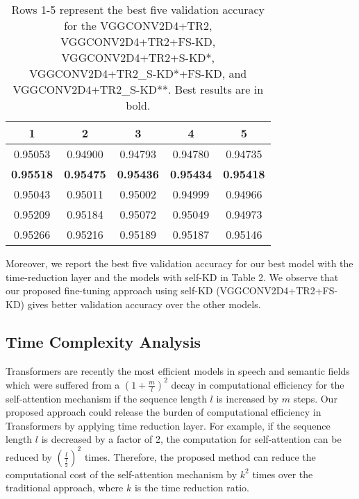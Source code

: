 \documentclass{article}
\begin{document}
\begin{table}[ht]
\caption{Rows 1-5 represent the best five validation accuracy for the VGGCONV2D4+TR2, VGGCONV2D4+TR2+FS-KD, VGGCONV2D4+TR2+S-KD*, VGGCONV2D4+TR2_S-KD*+FS-KD, and VGGCONV2D4+TR2_S-KD**. Best results are in bold.}
\label{val5}
\vskip 0.1in
\begin{center}
\begin{small}
\begin{sc}
\begin{tabular}{ccccc}
\toprule
    1&2&3&4&5 \\
\midrule
    0.95053& 0.94900& 0.94793& 0.94780& 0.94735 \\ 
    \textbf{0.95518}& \textbf{0.95475}& \textbf{0.95436}& \textbf{0.95434}& \textbf{0.95418} \\ 
    0.95043 & 0.95011& 0.95002& 0.94999& 0.94966 \\ 
    0.95209& 0.95184& 0.95072& 0.95049& 0.94973 \\ 
    0.95266& 0.95216& 0.95189& 0.95187& 0.95146 \\ 
\bottomrule
\end{tabular}
\end{sc}
\end{small}
\end{center}
\vskip -0.1in
\end{table}






Moreover, we  report the  best five  validation  accuracy for our best model with the time-reduction layer and the models with self-KD in Table 2. We observe that our proposed fine-tuning approach using self-KD (VGGCONV2D4+TR2+FS-KD) gives better validation accuracy over the other models. 

\subsection{Time Complexity Analysis}
Transformers are recently the most efficient models in speech and semantic fields which were suffered from a $(1+\frac{m}{l})^2$ decay in computational efficiency for the self-attention mechanism if the sequence length $l$ is increased by $m$ steps. Our proposed approach could release the burden of computational efficiency in Transformers by applying time reduction layer. For example, if the sequence length $l$ is decreased by a factor of 2, the computation for self-attention can be reduced by $(\frac{l}{\frac{l}{2}})^2$ times. Therefore, the proposed method can reduce the computational cost of the self-attention mechanism by $k^2$ times over the traditional approach, where $k$ is the time reduction ratio. 
\end{document}
